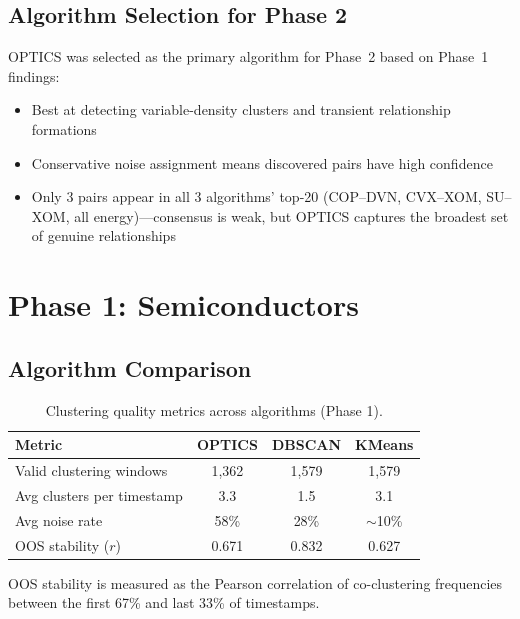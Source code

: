 \documentclass[11pt, a4paper]{article}
\begin{document}
\subsection{Algorithm Selection for Phase 2}

OPTICS was selected as the primary algorithm for Phase~2 based on Phase~1 findings:

\begin{itemize}
    \item Best at detecting variable-density clusters and transient relationship formations
    \item Conservative noise assignment means discovered pairs have high confidence
    \item Only 3 pairs appear in all 3 algorithms' top-20 (COP--DVN, CVX--XOM, SU--XOM, all energy)---consensus is weak, but OPTICS captures the broadest set of genuine relationships
\end{itemize}

\section{Phase 1: Semiconductors}

\subsection{Algorithm Comparison}

\begin{table}[H]
\centering
\caption{Clustering quality metrics across algorithms (Phase 1).}
\begin{tabular}{@{}lccc@{}}
\toprule
\textbf{Metric} & \textbf{OPTICS} & \textbf{DBSCAN} & \textbf{KMeans} \\
\midrule
Valid clustering windows   & 1,362  & 1,579  & 1,579  \\
Avg clusters per timestamp & 3.3    & 1.5    & 3.1    \\
Avg noise rate             & 58\%   & 28\%   & $\sim$10\% \\
OOS stability ($r$)        & 0.671  & 0.832  & 0.627  \\
\bottomrule
\end{tabular}
\label{tab:algo-quality}
\end{table}

OOS stability is measured as the Pearson correlation of co-clustering frequencies between the first 67\% and last 33\% of timestamps.
\end{document}
